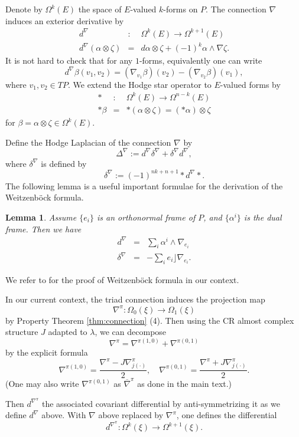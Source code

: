 \documentclass[reqno]{amsart}
\newcommand{\beastar}{\begin{eqnarray*}}
\newcommand{\eeastar}{\end{eqnarray*}}
\theoremstyle{theorem}
\newtheorem{lem}[thm]{Lemma}
\theoremstyle{definition}
\numberwithin{equation}{section}
\begin{document}
Denote by $\Omega^k(E)$ the space of $E$-valued $k$-forms on $P$. The connection $\nabla$
induces an exterior derivative by
\beastar
d^\nabla&:& \Omega^k(E)\to \Omega^{k+1}(E)\\
d^\nabla(\alpha\otimes \zeta)&=&d\alpha\otimes \zeta+(-1)^k\alpha\wedge \nabla\zeta.
\eeastar
It is not hard to check that for any $1$-forms, equivalently one can write
$$
d^\nabla\beta (v_1, v_2)=(\nabla_{v_1}\beta)(v_2)-(\nabla_{v_2}\beta)(v_1),
$$
where $v_1, v_2\in TP$.
We extend the Hodge star operator to $E$-valued forms by
\beastar
*&:&\Omega^k(E)\to \Omega^{n-k}(E)\\
*\beta&=&*(\alpha\otimes\zeta)=(*\alpha)\otimes\zeta
\eeastar
for $\beta=\alpha\otimes\zeta\in \Omega^k(E)$.

Define the Hodge Laplacian of the connection $\nabla$ by
$$
\Delta^{\nabla}:=d^{\nabla}\delta^{\nabla}+\delta^{\nabla}d^{\nabla},
$$
where $\delta^{\nabla}$ is defined by
$$
\delta^{\nabla}:=(-1)^{nk+n+1}*d^{\nabla}*.
$$
The following lemma is a useful important formulae for the derivation of the Weitzenb\"ock formula.
\begin{lem}\label{lem:d-delta} Assume $\{e_i\}$ is an orthonormal frame of $P$, and $\{\alpha^i\}$ is the dual frame.
Then we have
\beastar
d^{\nabla}&=&\sum_i\alpha^i\wedge \nabla_{e_i}\\
\delta^{\nabla}&=&-\sum_ie_i\rfloor \nabla_{e_i}.
\eeastar
\end{lem}
We refer to \cite[Appendix]{oh-wang:CR-map1} for the proof of Weitzenb\"ock formula
in our context.

In our current context, the triad connection induces the projection map
$$
\nabla^\pi: \Omega_0(\xi) \to \Omega_1(\xi)
$$
by Property Theorem \ref{thm:connection} (4). Then using the CR almost complex structure
$J$ adapted to $\lambda$, we can decompose
$$
\nabla^\pi = \nabla^{\pi(1,0)} + \nabla^{\pi(0,1)}
$$
by the explicit formula
$$
\nabla^{\pi(1,0)} = \frac{\nabla^\pi - J \nabla^\pi_{j(\cdot)}}{2}, \quad
\nabla^{\pi(0,1)} = \frac{\nabla^\pi + J \nabla^\pi_{j(\cdot)}}{2}.
$$
(One may also write $\nabla^{\pi(0,1)}$ as $\overline{\nabla}^\pi$ as done in the main
text.)

Then $d^{\nabla^\pi}$ the associated covariant differential by anti-symmetrizing
it as we define $d^\nabla$ above.
With $\nabla$ above replaced by $\nabla^\pi$, one defines the differential
$$
d^{\nabla^\pi}: \Omega^k(\xi) \to \Omega^{k+1}(\xi).
$$
\end{document}
